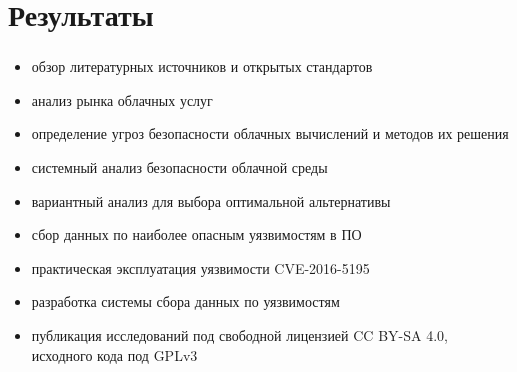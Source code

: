 
\section{Результаты}

\begin{frame}
\frametitle{\insertsection}

\begin{itemize}
    \item обзор литературных источников и открытых стандартов
    \item анализ рынка облачных услуг
    \item определение угроз безопасности облачных вычислений и методов их решения
    \item системный анализ безопасности облачной среды
    \item вариантный анализ для выбора оптимальной альтернативы
    \item сбор данных по наиболее опасным уязвимостям в ПО
    \item практическая эксплуатация уязвимости CVE-2016-5195
    \item разработка системы сбора данных по уязвимостям
    \item публикация исследований под свободной лицензией {\color{green}CC BY-SA 4.0}, исходного кода под {\color{green}GPLv3}
\end{itemize}
\end{frame}

